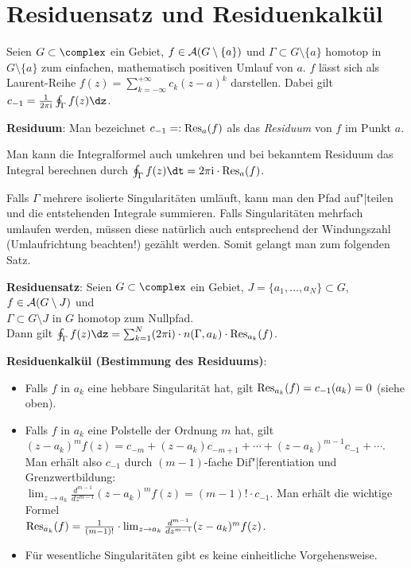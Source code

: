 \pagebreak

\section{%
    Residuensatz und Residuenkalkül%
}

Seien $G \subset \complex$ ein Gebiet, $f \in \mathcal{A}(G \setminus \{a\})$
und $\Gamma \subset G \setminus \{a\}$ homotop in $G \setminus \{a\}$ zum
einfachen, mathematisch positiven Umlauf von $a$.
$f$ lässt sich als Laurent-Reihe
$f(z) = \sum_{k=-\infty}^{+\infty} c_k (z - a)^k$
darstellen.
Dabei gilt $c_{-1} = \frac{1}{2\pi\i} \oint_\Gamma f(z)\dz$.

\textbf{Residuum}:
Man bezeichnet $c_{-1} =: \operatorname{Res}_a(f)$ als
das \emph{Residuum} von $f$ im Punkt $a$.

Man kann die Integralformel auch umkehren und bei bekanntem Residuum das
Integral berechnen durch
$\oint_\Gamma f(z)\dt = 2\pi\i \cdot \Res_a(f)$.

Falls $\Gamma$ mehrere isolierte Singularitäten umläuft, kann man den
Pfad auf"|teilen und die entstehenden Integrale summieren.
Falls Singularitäten mehrfach umlaufen werden, müssen diese natürlich auch
entsprechend der Windungszahl (Umlaufrichtung beachten!) gezählt werden.
Somit gelangt man zum folgenden Satz.

\textbf{Residuensatz}:
Seien $G \subset \complex$ ein Gebiet, $J = \{a_1, \dotsc, a_N\} \subset G$,
$f \in \mathcal{A}(G \setminus J)$ und\\
$\Gamma \subset G \setminus J$ in $G$ homotop zum Nullpfad.\\
Dann gilt $\oint_\Gamma f(z)\dz =
\sum_{k=1}^N (2\pi\i) \cdot n(\Gamma, a_k) \cdot \Res_{a_k}(f)$.

\linie

\textbf{Residuenkalkül (Bestimmung des Residuums)}:
\begin{itemize}
    \item
    Falls $f$ in $a_k$ eine hebbare Singularität hat, gilt
    $\operatorname{Res}_{a_k}(f) = c_{-1}(a_k) = 0$ (siehe oben).

    \item
    Falls $f$ in $a_k$ eine Polstelle der Ordnung $m$ hat, gilt\\
    $(z - a_k)^m f(z) =
    c_{-m} + (z - a_k) c_{-m+1} + \dotsb + (z - a_k)^{m-1} c_{-1} + \dotsb$.\\
    Man erhält also $c_{-1}$ durch $(m - 1)$-fache Dif"|ferentiation
    und Grenzwertbildung:\\
    $\lim_{z \to a_k} \frac{d^{m-1}}{dz^{m-1}} (z - a_k)^m f(z) =
    (m - 1)! \cdot c_{-1}$.
    Man erhält die wichtige Formel\\
    $\operatorname{Res}_{a_k}(f) = \frac{1}{(m - 1)!} \cdot
    \lim_{z \to a_k} \frac{d^{m-1}}{dz^{m-1}} (z - a_k)^m f(z)$.

    \item
    Für wesentliche Singularitäten gibt es keine einheitliche Vorgehensweise.
\end{itemize}

